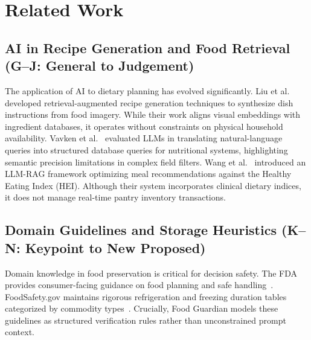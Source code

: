 \section{Related Work}

\subsection{AI in Recipe Generation and Food Retrieval (G--J: General to Judgement)}
The application of AI to dietary planning has evolved significantly. Liu et al.~\cite{R4_Liu2025_WACV} developed retrieval-augmented recipe generation techniques to synthesize dish instructions from food imagery. While their work aligns visual embeddings with ingredient databases, it operates without constraints on physical household availability. Vavken et al.~\cite{R5_Vavken2026} evaluated LLMs in translating natural-language queries into structured database queries for nutritional systems, highlighting semantic precision limitations in complex field filters. Wang et al.~\cite{R6_Wang2026} introduced an LLM-RAG framework optimizing meal recommendations against the Healthy Eating Index (HEI). Although their system incorporates clinical dietary indices, it does not manage real-time pantry inventory transactions.

\subsection{Domain Guidelines and Storage Heuristics (K--N: Keypoint to New Proposed)}
Domain knowledge in food preservation is critical for decision safety. The FDA provides consumer-facing guidance on food planning and safe handling~\cite{R2_FDA2026}. FoodSafety.gov maintains rigorous refrigeration and freezing duration tables categorized by commodity types~\cite{R3_FoodSafety2023}. Crucially, Food Guardian models these guidelines as structured verification rules rather than unconstrained prompt context.

